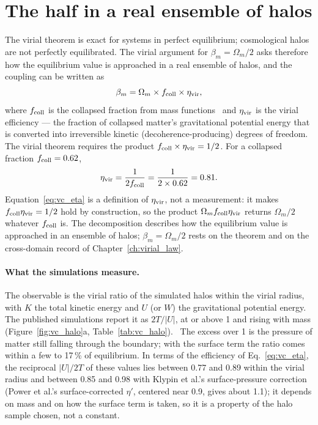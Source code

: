 \section{The half in a real ensemble of halos}\label{sec:vc_population}
The virial theorem is exact for systems in perfect equilibrium; cosmological halos are not perfectly equilibrated. The virial argument for
$\beta_m=\Omega_m/2$ asks therefore how the equilibrium value is approached in a real ensemble of halos, and the coupling can be written as
\begin{equation}
\beta_m=\Omega_m\times f_{\rm coll}\times\eta_{\rm vir},\label{eq:vc_decompose}
\end{equation} \derived{}
where $f_{\rm coll}$ is the collapsed fraction from mass functions~\cite{Tinker2008} and $\eta_{\rm vir}$ is the virial efficiency --- the fraction of collapsed matter's
gravitational potential energy that is converted into irreversible kinetic (decoherence-producing) degrees of freedom. The virial theorem requires the
product $f_{\rm coll}\times\eta_{\rm vir}=1/2$. For a collapsed fraction $f_{\rm coll}=0.62$,
\begin{equation}
\eta_{\rm vir}=\frac{1}{2f_{\rm coll}}=\frac{1}{2\times0.62}=0.81 .\label{eq:vc_eta}
\end{equation} \calc{}
Equation~\eqref{eq:vc_eta} is a definition of $\eta_{\rm vir}$, not a measurement: it makes $f_{\rm coll}\eta_{\rm vir}=1/2$ hold by construction, so the
product $\Omega_mf_{\rm coll}\eta_{\rm vir}$ returns $\Omega_m/2$ whatever $f_{\rm coll}$ is. The decomposition describes how the equilibrium value is
approached in an ensemble of halos; $\beta_m=\Omega_m/2$ rests on the theorem and on the cross-domain record of Chapter~\ref{ch:virial_law}.

\paragraph{What the simulations measure.} The observable is the virial ratio of the simulated halos within the virial radius, with $K$ the total kinetic
energy and $U$ (or $W$) the gravitational potential energy. The published simulations report it as $2T/|U|$, at or above 1 and rising with mass
(Figure~\ref{fig:vc_halo}a, Table~\ref{tab:vc_halo}). \observed\ The excess over 1 is the pressure of matter still falling through the boundary; with the
surface term the ratio comes within a few to 17\,\% of equilibrium. In terms of the efficiency of Eq.~\eqref{eq:vc_eta}, the reciprocal $|U|/2T$ of these
values lies between 0.77 and 0.89 within the virial radius and between 0.85 and 0.98 with Klypin et al.'s surface-pressure correction (Power et al.'s
surface-corrected $\eta'$, centered near 0.9, gives about 1.1); it depends on mass and on how the surface term is taken, so it is a property of the
halo sample chosen, not a constant. \calc

